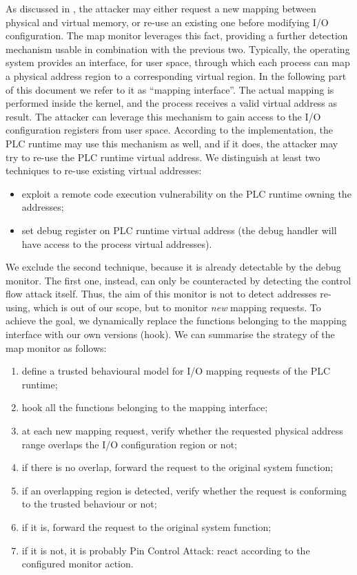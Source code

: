 As discussed in , the attacker may either request a new mapping between physical and virtual memory, or re-use an existing one before
modifying I/O configuration. The map monitor leverages this fact, providing a further detection mechanism usable in combination with the previous two.
Typically, the operating system provides an interface, for user space, through which each process can map a physical address region to a corresponding virtual region.
In the following part of this document we refer to it as ``mapping interface''.
The actual mapping is performed inside the kernel, and the process receives a valid virtual address as result.
The attacker can leverage this mechanism to gain access to the I/O configuration registers from user space.
According to the implementation, the PLC runtime may use this mechanism as well, and if it does, the attacker may try to re-use the PLC runtime virtual address.
We distinguish at least two techniques to re-use existing virtual addresses:
\begin{itemize}
	\item exploit a remote code execution vulnerability on the PLC runtime owning the addresses;
	\item set debug register on PLC runtime virtual address (the debug handler will have access to the process virtual addresses).
\end{itemize}
We exclude the second technique, because it is already detectable by the debug monitor. The first one, instead, can only be counteracted by detecting the control flow attack itself.
Thus, the aim of this monitor is not to detect addresses re-using, which is out of our scope, but to monitor \emph{new} mapping requests.
To achieve the goal, we dynamically replace the functions belonging to the mapping interface with our own versions (hook).
We can summarise the strategy of the map monitor as follows:
\begin{enumerate}
	\item \label{enum:map_model} define a trusted behavioural model for I/O mapping requests of the PLC runtime;
	\item hook all the functions belonging to the mapping interface;
	\item at each new mapping request, verify whether the requested physical address range overlaps the I/O configuration region or not;
	\item if there is no overlap, forward the request to the original system function;
	\item if an overlapping region is detected, verify whether the request is conforming to the trusted behaviour or not;
	\item if it is, forward the request to the original system function;
	\item if it is not, it is probably Pin Control Attack: react according to the configured monitor action.
\end{enumerate}
